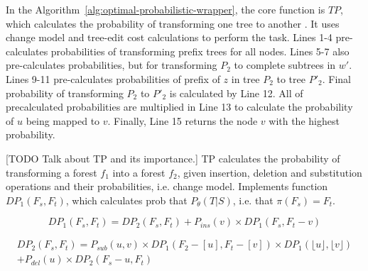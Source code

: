 In the Algorithm~\ref{alg:optimal-probabilistic-wrapper}, the core function is $TP$, which calculates the probability of transforming one tree to another \cite{dalvi2009a}. It uses change model and tree-edit cost calculations to perform the task. Lines 1-4 pre-calculates probabilities of transforming prefix trees for all nodes. Lines 5-7 also pre-calculates probabilities, but for transforming $P_2$ to complete subtrees in $w'$. Lines 9-11 pre-calculates probabilities of prefix of $z$ in tree $P_2$ to tree $P'_2$. Final probability of transforming $P_2$ to $P'_2$ is calculated by Line 12. All of precalculated probabilities are multiplied in Line 13 to calculate the probability of $u$ being mapped to $v$. Finally, Line 15 returns the node $v$ with the highest probability.

[TODO Talk about TP and its importance.]
TP calculates the probability of transforming a forest $f_1$ into a forest $f_2$, given insertion, deletion and substitution operations and their probabilities, i.e. change model. Implements function $DP_1(F_s, F_t)$, which calculates prob that $P_{\theta}(T|S)$, i.e. that $\pi(F_s) = F_t$.

\begin{equation}
	DP_1(F_s, F_t) = DP_2(F_s, F_t) + P_{ins}(v) \times DP_1(F_s, F_t - v)
\end{equation}

\begin{equation}
	\begin{split}
		DP_2(F_s, F_t) = P_{sub}(u, v) \times DP_1(F_2 - [u], F_t - [v]) \times DP_1(\lfloor u \rfloor, \lfloor v \rfloor) \\
		+ P_{del}(u) \times DP_2(F_s - u, F_t)
	\end{split}
\end{equation}





